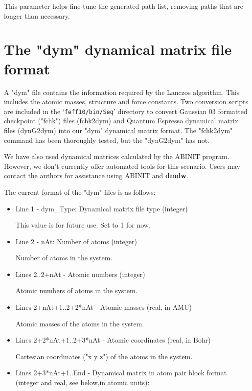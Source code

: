 \documentclass[11pt,oneside]{report} %
\newcommand{\file}[1]{`\texttt{#1}'}
\newcommand{\module}[1]{\textrm{\bf{#1}}}
\begin{document}
\begin{latexonly}
\begin{itemize}
		This parameter helps fine-tune the generated path list, removing
		paths that are longer than necessary.
\end{itemize}



 \section{The "dym" dynamical matrix file format}

  A "dym" file contains the information required by the Lanczos algorithm. This
  includes the atomic masses, structure and force constants. Two conversion
  scripts are included in the \file{feff10/bin/Seq} directory to convert Gaussian 03 formatted
  checkpoint ("fchk") files (fchk2dym) and Quantum Espresso dynamical matrix
  files (dynG2dym) into our "dym" dynamical matrix format. The "fchk2dym"
  command has been thoroughly tested, but the "dynG2dym" has not. 
  
  We have also used dynamical matrices calculated by the ABINIT program.  However, we don't currently offer
  automated tools for this scenario.  Users may contact the authors for assistance using ABINIT and \module{dmdw}.
  
  The current format of the "dym" files is as follows:
\begin{itemize}
\item Line 1 - dym\_Type: Dynamical matrix file type (integer)

  This value is for future use. Set to 1 for now.

\item Line 2 - nAt: Number of atoms (integer)

  Number of atoms in the system.
  
\item Lines 2..2+nAt - Atomic numbers (integer)

  Atomic numbers of atoms in the system.

\item Lines 2+nAt+1..2+2*nAt - Atomic masses (real, in AMU)

  Atomic masses of the atoms in the system.

\item Lines 2+2*nAt+1..2+3*nAt - Atomic coordinates (real, in Bohr)

  Cartesian coordinates ("x y z") of the atoms in the system.

\item Lines 2+3*nAt+1..End - Dynamical matrix in atom pair block format (integer and
                       real, see below,in atomic units):


\end{itemize}
\end{latexonly}
\end{document}
